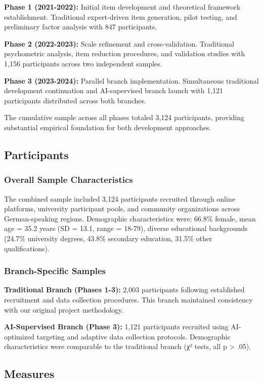 \documentclass[12pt,a4paper]{article}
\begin{document}
\textbf{Phase 1 (2021-2022):} Initial item development and theoretical framework establishment. Traditional expert-driven item generation, pilot testing, and preliminary factor analysis with 847 participants.

\textbf{Phase 2 (2022-2023):} Scale refinement and cross-validation. Traditional psychometric analysis, item reduction procedures, and validation studies with 1,156 participants across two independent samples.

\textbf{Phase 3 (2023-2024):} Parallel branch implementation. Simultaneous traditional development continuation and AI-supervised branch launch with 1,121 participants distributed across both branches.

The cumulative sample across all phases totaled 3,124 participants, providing substantial empirical foundation for both development approaches.

\subsection{Participants}

\subsubsection{Overall Sample Characteristics}

The combined sample included 3,124 participants recruited through online platforms, university participant pools, and community organizations across German-speaking regions. Demographic characteristics were: 66.8\% female, mean age = 35.2 years (SD = 13.1, range = 18-79), diverse educational backgrounds (24.7\% university degrees, 43.8\% secondary education, 31.5\% other qualifications).

\subsubsection{Branch-Specific Samples}

\textbf{Traditional Branch (Phases 1-3):} 2,003 participants following established recruitment and data collection procedures. This branch maintained consistency with our original project methodology.

\textbf{AI-Supervised Branch (Phase 3):} 1,121 participants recruited using AI-optimized targeting and adaptive data collection protocols. Demographic characteristics were comparable to the traditional branch (χ² tests, all p > .05).

\subsection{Measures}
\end{document}
